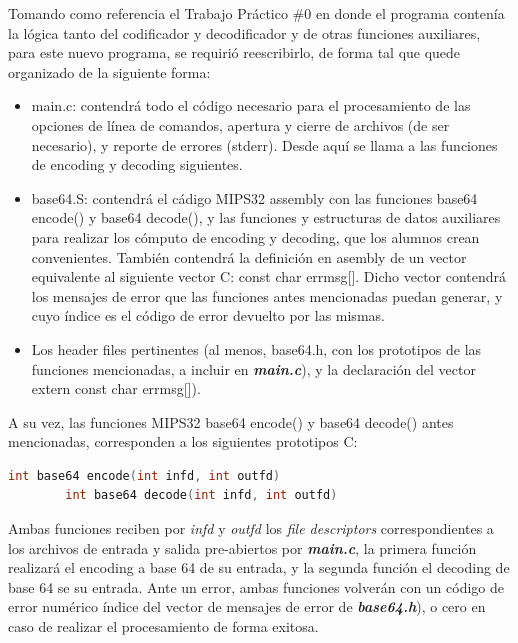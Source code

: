 \documentclass[11pt,a4paper]{article}
\begin{document}
Tomando como referencia el Trabajo Práctico \#0 en donde el programa contenía la lógica tanto del codificador y decodificador y de otras funciones auxiliares, para este nuevo programa, se requirió reescribirlo, de forma tal que quede organizado de la siguiente forma:

\begin{itemize}
	\item{main.c:} contendrá todo el código necesario para el procesamiento de las opciones de línea de comandos, apertura y cierre de archivos (de ser necesario), y reporte de errores (stderr). Desde aquí se llama a las funciones de encoding y decoding siguientes.
	\item {base64.S:} contendrá el cádigo MIPS32 assembly con las funciones base64 encode() y base64 decode(), y las funciones y estructuras de datos auxiliares para realizar los cómputo de encoding y decoding, que
los alumnos crean convenientes. También contendrá la definición en asembly de un vector equivalente al siguiente vector C: const char\* errmsg[]. Dicho vector contendrá los mensajes de error que las funciones antes mencionadas puedan generar, y cuyo índice es el código de error devuelto por las mismas.
	\item{Los header files pertinentes} (al menos, base64.h, con los prototipos de las funciones mencionadas, a incluir en \textit{\textbf{main.c}}), y la declaración del vector extern const char\* errmsg[]).

\end{itemize}

A su vez, las funciones MIPS32 base64 encode() y base64 decode() antes mencionadas, corresponden a los siguientes prototipos C:

	\begin{lstlisting}[language=C]
		int base64 encode(int infd, int outfd)
		int base64 decode(int infd, int outfd)
	\end{lstlisting}

Ambas funciones reciben por \textit{infd} y \textit{outfd} los \textit{file descriptors} correspondientes a los archivos de entrada y salida pre-abiertos por \textit{\textbf{main.c}}, la primera función realizará el encoding a base 64 de su entrada, y la segunda función el decoding de base 64 se su entrada.
Ante un error, ambas funciones volverán con un código de error numérico índice del vector de mensajes de error de \textit{\textbf{base64.h}}), o cero en caso de realizar el procesamiento de forma exitosa.
\end{document}
